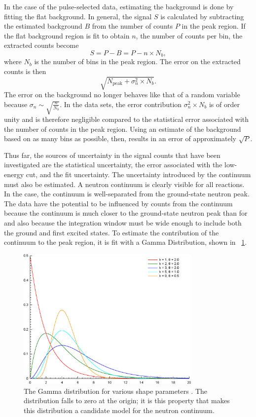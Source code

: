 In the case of the pulse-selected data, estimating the background is done by fitting the flat background.  In general, the signal $S$ is calculated by subtracting the estimated background $B$ from the number of counts $P$ in the peak region.  If the flat background region is fit to obtain $n$, the number of counts per bin, the extracted counts become
\begin{equation}
S = P - B = P - n\times N_b,
\end{equation}
where $N_b$ is the number of bins in the peak region.  The error on the extracted counts is then
\begin{equation}
\sqrt{N_{\text{peak}} + {\sigma}_n^2\times N_b}.
\end{equation}
The error on the background no longer behaves like that of a random variable because $\sigma_n\sim\sqrt{\frac{n}{N_b}}$.  In the \reaction data sets, the error contribution ${\sigma}_n^2\times N_b$ is of order unity and is therefore negligible compared to the statistical error associated with the number of counts in the peak region.  Using an estimate of the background based on as many bins as possible, then, results in an error of approximately $\sqrt{P}$.

Thus far, the sources of uncertainty in the signal counts that have been investigated are the statistical uncertainty, the error associated with the low-energy cut, and the fit uncertainty.  The uncertainty introduced by the continuum must also be estimated.  A neutron continuum is clearly visible for all reactions.  In the  case, the continuum is well-separated from the ground-state neutron peak.  The \reaction data have the potential to be influenced by counts from the continuum because the continuum is much closer to the ground-state neutron peak than for \MgReaction and also because the integration window must be wide enough to include both the ground and first excited states.  To estimate the contribution of the continuum to the peak region, it is fit with a Gamma Distribution, shown in {\fig}~\ref{fig:BetaGamma}.  
\begin{figure}[!htbp]
\centering
\includegraphics[width=0.8\textwidth]{figures/Gamma_distribution_pdf.eps}
\caption[The Gamma distribution.]{The Gamma distribution for various shape parameters \citep{wiki_Gamma}.  The distribution falls to zero at the origin; it is this property that makes this distribution a candidate model for the neutron continuum.}
\label{fig:BetaGamma}
\end{figure}

